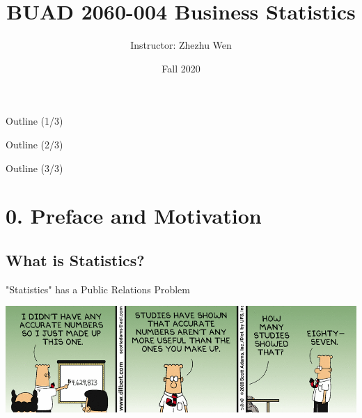 \documentclass{beamer}
\title[LaTeX Workshop]{BUAD 2060-004 Business Statistics}
\author{Instructor: \linebreak Zhezhu Wen}
\institute{The University of Toledo }
\date{Fall 2020}
\begin{document}
\begin{frame}
  \titlepage
\end{frame}




\begin{frame}{Outline (1/3)}

\begin{small}
\begin{multicols}{2}
  \tableofcontents[sections={1-3}]

\end{multicols}
\end{small}

\end{frame}


\begin{frame}{Outline (2/3)}

\begin{small}
\begin{multicols}{2}
  \tableofcontents[sections={4-5}]

\end{multicols}
\end{small}


\end{frame}


\begin{frame}{Outline (3/3)}

\begin{small}
\begin{multicols}{2}
  \tableofcontents[sections={6}]

\end{multicols}
\end{small}


\end{frame}



\section{0. Preface and Motivation}
\subsection{What is Statistics?} 


\begin{frame}{"Statistics" has a Public Relations Problem}

\begin{center}
\includegraphics[scale=0.48]{dilbertStatistics.png}
\end{center}


\end{frame}
\end{document}
